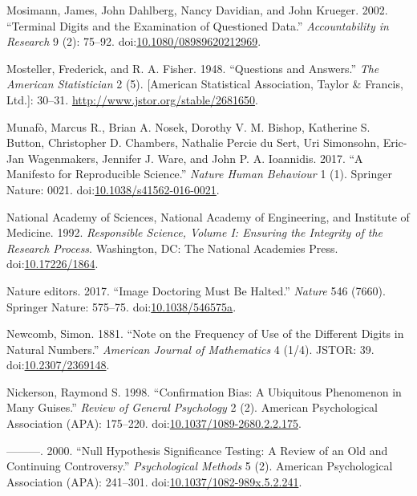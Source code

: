 \documentclass[a5paper]{book}
\begin{document}
\hypertarget{ref-doi:10.1080ux2f08989620212969}{}
Mosimann, James, John Dahlberg, Nancy Davidian, and John Krueger. 2002.
``Terminal Digits and the Examination of Questioned Data.''
\emph{Accountability in Research} 9 (2): 75--92.
doi:\href{https://doi.org/10.1080/08989620212969}{10.1080/08989620212969}.

\hypertarget{ref-doi:10.2307ux2f2681650}{}
Mosteller, Frederick, and R. A. Fisher. 1948. ``Questions and Answers.''
\emph{The American Statistician} 2 (5). {[}American Statistical
Association, Taylor \& Francis, Ltd.{]}: 30--31.
\url{http://www.jstor.org/stable/2681650}.

\hypertarget{ref-doi:10.1038ux2fs41562-016-0021}{}
Munafò, Marcus R., Brian A. Nosek, Dorothy V. M. Bishop, Katherine S.
Button, Christopher D. Chambers, Nathalie Percie du Sert, Uri Simonsohn,
Eric-Jan Wagenmakers, Jennifer J. Ware, and John P. A. Ioannidis. 2017.
``A Manifesto for Reproducible Science.'' \emph{Nature Human Behaviour}
1 (1). Springer Nature: 0021.
doi:\href{https://doi.org/10.1038/s41562-016-0021}{10.1038/s41562-016-0021}.

\hypertarget{ref-doi:10.17226ux2f1864}{}
National Academy of Sciences, National Academy of Engineering, and
Institute of Medicine. 1992. \emph{Responsible Science, Volume I:
Ensuring the Integrity of the Research Process}. Washington, DC: The
National Academies Press.
doi:\href{https://doi.org/10.17226/1864}{10.17226/1864}.

\hypertarget{ref-doi:10.1038ux2f546575a}{}
Nature editors. 2017. ``Image Doctoring Must Be Halted.'' \emph{Nature}
546 (7660). Springer Nature: 575--75.
doi:\href{https://doi.org/10.1038/546575a}{10.1038/546575a}.

\hypertarget{ref-doi:10.2307ux2f2369148}{}
Newcomb, Simon. 1881. ``Note on the Frequency of Use of the Different
Digits in Natural Numbers.'' \emph{American Journal of Mathematics} 4
(1/4). JSTOR: 39.
doi:\href{https://doi.org/10.2307/2369148}{10.2307/2369148}.

\hypertarget{ref-doi:10.1037ux2f1089-2680.2.2.175}{}
Nickerson, Raymond S. 1998. ``Confirmation Bias: A Ubiquitous Phenomenon
in Many Guises.'' \emph{Review of General Psychology} 2 (2). American
Psychological Association (APA): 175--220.
doi:\href{https://doi.org/10.1037/1089-2680.2.2.175}{10.1037/1089-2680.2.2.175}.

\hypertarget{ref-doi:10.1037ux2f1082-989X.5.2.241}{}
---------. 2000. ``Null Hypothesis Significance Testing: A Review of an
Old and Continuing Controversy.'' \emph{Psychological Methods} 5 (2).
American Psychological Association (APA): 241--301.
doi:\href{https://doi.org/10.1037/1082-989x.5.2.241}{10.1037/1082-989x.5.2.241}.
\end{document}
